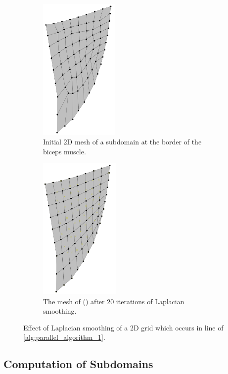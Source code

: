 \begin{figure}%
  \centering%
  \begin{subfigure}[t]{0.48\textwidth}%
    \centering%
    \includegraphics[height=7cm]{images/parallel_fiber_estimation/world_mesh.png}
    \caption{Initial 2D mesh of a subdomain at the border of the biceps muscle.}%
    \label{fig:world_mesh}%
  \end{subfigure}
  \quad
  \begin{subfigure}[t]{0.48\textwidth}%
    \centering%
    \includegraphics[height=7cm]{images/parallel_fiber_estimation/world_mesh_improved.png}
    \caption{The mesh of () after 20 iterations of Laplacian smoothing.}%
    \label{fig:world_mesh_improved}%
  \end{subfigure}    
  \caption{Effect of Laplacian smoothing of a 2D grid which occurs in line  of \cref{alg:parallel_algorithm_1}.}%
  \label{fig:laplace_smoothing}%
\end{figure}%

\subsection{Computation of Subdomains}

